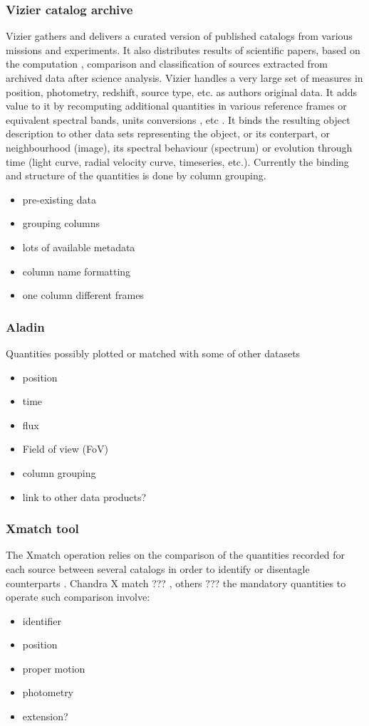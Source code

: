 \documentclass[11pt,a4paper]{ivoa}
\begin{document}
\subsubsection{Vizier catalog archive  }
Vizier gathers and delivers a curated version of published catalogs from various missions and experiments.
It also distributes results of scientific papers, based on the computation , comparison and classification of sources extracted from archived data after science analysis.
Vizier handles a very large set of measures in position, photometry, redshift, source type, etc. as authors original data.
It adds value to it by recomputing additional quantities in various reference frames or equivalent spectral bands, units conversions , etc .
It binds the resulting object description to other data sets representing the object, or its conterpart, or neighbourhood (image), its spectral behaviour (spectrum) or evolution through time (light curve, radial velocity curve, timeseries, etc.).
Currently the binding and structure of the quantities is done by column grouping.
\begin{itemize}
    \item pre-existing data
    \item grouping columns
    \item lots of available metadata
    \item column name formatting
    \item one column different frames
\end{itemize}

\subsubsection{Aladin}

Quantities possibly plotted or matched with some of other datasets
\begin{itemize}
    \item position
    \item time
    \item flux
    \item Field of view (FoV)
    \item column grouping
    \item link to other data products?
\end{itemize}

\subsubsection{X\-match tool }
The Xmatch operation relies on the comparison of the quantities recorded for each source between several catalogs in order to identify or disentagle counterparts .
Chandra X match ??? , others ???
the mandatory quantities to operate such comparison involve:
\begin{itemize}
    \item identifier
    \item position
    \item proper motion
    \item photometry
    \item extension?
\end{itemize}
\end{document}
